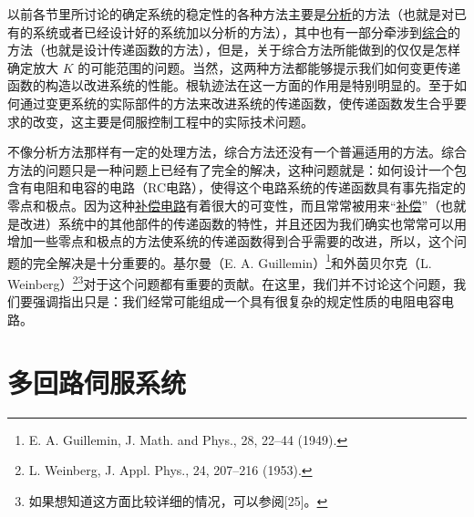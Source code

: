 以前各节里所讨论的确定系统的稳定性的各种方法主要是\underline{分析}的方法（也就是对已有的系统或者已经设计好的系统加以分析的方法），其中也有一部分牵涉到\underline{综合}的方法（也就是设计传递函数的方法），但是，关于综合方法所能做到的仅仅是怎样确定放大 $K$ 的可能范围的问题。当然，这两种方法都能够提示我们如何变更传递函数的构造以改进系统的性能。根轨迹法在这一方面的作用是特别明显的。至于如何通过变更系统的实际部件的方法来改进系统的传递函数，使传递函数发生合乎要求的改变，这主要是伺服控制工程中的实际技术问题。

不像分析方法那样有一定的处理方法，综合方法还没有一个普遍适用的方法。综合方法的问题只是一种问题上已经有了完全的解决，这种问题就是：如何设计一个包含有电阻和电容的电路（RC电路），使得这个电路系统的传递函数具有事先指定的零点和极点。因为这种\underline{补偿电路}有着很大的可变性，而且常常被用来“\underline{补偿}”（也就是改进）系统中的其他部件的传递函数的特性，并且还因为我们确实也常常可以用增加一些零点和极点的方法使系统的传递函数得到合乎需要的改进，所以，这个问题的完全解决是十分重要的。基尔曼（E. A. Guillemin）\footnote{E. A. Guillemin, J. Math. and Phys., 28, 22--44 (1949).}和外茵贝尔克（L. Weinberg）\footnote{L. Weinberg, J. Appl. Phys., 24, 207--216 (1953).}\footnote{如果想知道这方面比较详细的情况，可以参阅[25]。}对于这个问题都有重要的贡献。在这里，我们并不讨论这个问题，我们要强调指出只是：我们经常可能组成一个具有很复杂的规定性质的电阻电容电路。

\section{多回路伺服系统}

